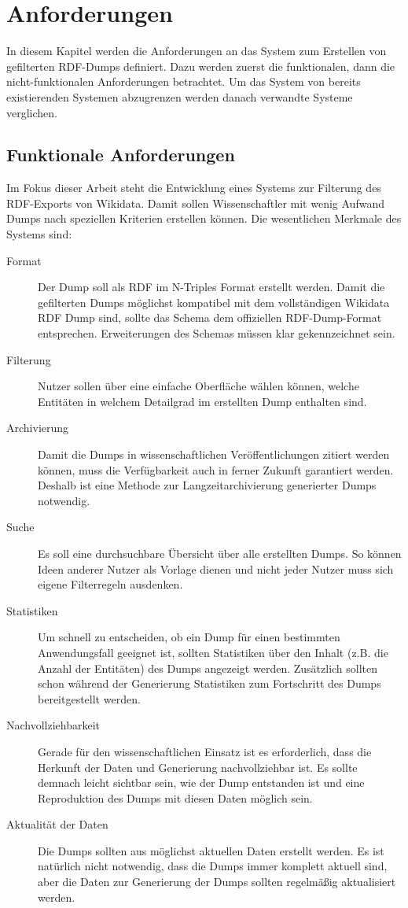 \chapter{Anforderungen}
\label{chap:requirements}
In diesem Kapitel werden die Anforderungen an das System zum Erstellen von gefilterten RDF-Dumps definiert.
Dazu werden zuerst die funktionalen, dann die nicht-funktionalen Anforderungen betrachtet.
Um das System von bereits existierenden Systemen abzugrenzen werden danach verwandte Systeme verglichen.

\section{Funktionale Anforderungen}
Im Fokus dieser Arbeit steht die Entwicklung eines Systems zur Filterung des RDF-Exports von Wikidata.
Damit sollen Wissenschaftler mit wenig Aufwand Dumps nach speziellen Kriterien erstellen können.
Die wesentlichen Merkmale des Systems sind:

\begin{description}
  \item[Format] Der Dump soll als RDF im N-Triples Format erstellt werden. Damit die gefilterten Dumps möglichst kompatibel mit dem vollständigen Wikidata RDF Dump sind, sollte das Schema dem offiziellen RDF-Dump-Format entsprechen. Erweiterungen des Schemas müssen klar gekennzeichnet sein.
  \item[Filterung] Nutzer sollen über eine einfache Oberfläche wählen können, welche Entitäten in welchem Detailgrad im erstellten Dump enthalten sind. 
  \item[Archivierung] Damit die Dumps in wissenschaftlichen Veröffentlichungen zitiert werden können, muss die Verfügbarkeit auch in ferner Zukunft garantiert werden. Deshalb ist eine Methode zur Langzeitarchivierung generierter Dumps notwendig. 
  \item[Suche] Es soll eine durchsuchbare Übersicht über alle erstellten Dumps.
    So können Ideen anderer Nutzer als Vorlage dienen und nicht jeder Nutzer muss sich eigene Filterregeln ausdenken.
  \item[Statistiken] Um schnell zu entscheiden, ob ein Dump für einen bestimmten Anwendungsfall geeignet ist, sollten Statistiken über den Inhalt (z.B. die Anzahl der Entitäten) des Dumps angezeigt werden. Zusätzlich sollten schon während der Generierung Statistiken zum Fortschritt des Dumps bereitgestellt werden.
  \item[Nachvollziehbarkeit] Gerade für den wissenschaftlichen Einsatz ist es erforderlich, dass die Herkunft der Daten und Generierung nachvollziehbar ist. Es sollte demnach leicht sichtbar sein, wie der Dump entstanden ist und eine Reproduktion des Dumps mit diesen Daten möglich sein. 
  \item[Aktualität der Daten] Die Dumps sollten aus möglichst aktuellen Daten erstellt werden.
    Es ist natürlich nicht notwendig, dass die Dumps immer komplett aktuell sind, aber die Daten zur Generierung der Dumps sollten regelmäßig aktualisiert werden.
\end{description}

